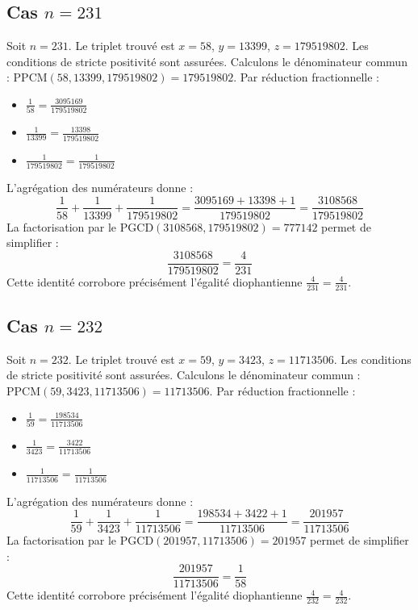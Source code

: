 \documentclass[11pt,a4paper]{article}
\begin{document}
\subsection{Cas $n = 231$}
Soit $n = 231$. Le triplet trouvé est $x = 58$, $y = 13399$, $z = 179519802$.
Les conditions de stricte positivité sont assurées.
Calculons le dénominateur commun : $\text{PPCM}(58, 13399, 179519802) = 179519802$.
Par réduction fractionnelle :
\begin{itemize}
    \item $\frac{1}{58} = \frac{3095169}{179519802}$
    \item $\frac{1}{13399} = \frac{13398}{179519802}$
    \item $\frac{1}{179519802} = \frac{1}{179519802}$
\end{itemize}
L'agrégation des numérateurs donne :
$$ \frac{1}{58} + \frac{1}{13399} + \frac{1}{179519802} = \frac{3095169 + 13398 + 1}{179519802} = \frac{3108568}{179519802} $$
La factorisation par le $\text{PGCD}(3108568, 179519802) = 777142$ permet de simplifier :
$$ \frac{3108568}{179519802} = \frac{4}{231} $$
Cette identité corrobore précisément l'égalité diophantienne $\frac{4}{231} = \frac{4}{231}$.

\subsection{Cas $n = 232$}
Soit $n = 232$. Le triplet trouvé est $x = 59$, $y = 3423$, $z = 11713506$.
Les conditions de stricte positivité sont assurées.
Calculons le dénominateur commun : $\text{PPCM}(59, 3423, 11713506) = 11713506$.
Par réduction fractionnelle :
\begin{itemize}
    \item $\frac{1}{59} = \frac{198534}{11713506}$
    \item $\frac{1}{3423} = \frac{3422}{11713506}$
    \item $\frac{1}{11713506} = \frac{1}{11713506}$
\end{itemize}
L'agrégation des numérateurs donne :
$$ \frac{1}{59} + \frac{1}{3423} + \frac{1}{11713506} = \frac{198534 + 3422 + 1}{11713506} = \frac{201957}{11713506} $$
La factorisation par le $\text{PGCD}(201957, 11713506) = 201957$ permet de simplifier :
$$ \frac{201957}{11713506} = \frac{1}{58} $$
Cette identité corrobore précisément l'égalité diophantienne $\frac{4}{232} = \frac{4}{232}$.
\end{document}
